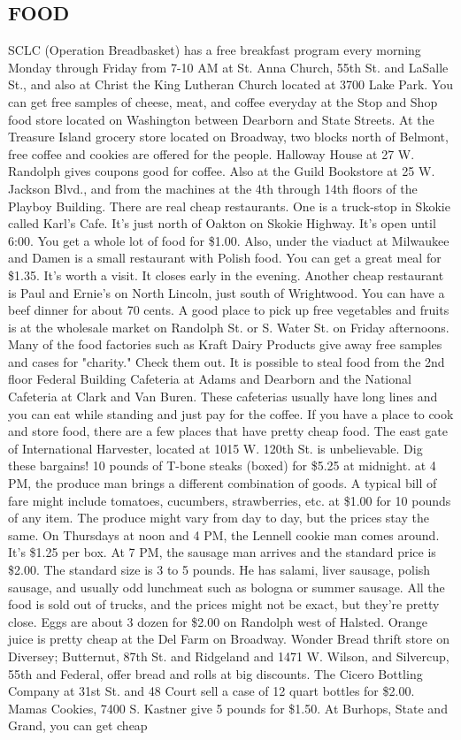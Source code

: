 \documentclass[11pt,twoside,a4paper]{book}
\begin{document}
\subsection{FOOD}
SCLC (Operation Breadbasket) has a free breakfast program every morning Monday through Friday from 7-10 AM at St. Anna Church, 55th St. and LaSalle St., and also at Christ the King Lutheran Church located at 3700 Lake Park. You can get free samples of cheese, meat, and coffee everyday at the Stop and Shop food store located on Washington between Dearborn and State Streets. At the Treasure Island grocery store located on Broadway, two blocks north of Belmont, free coffee and cookies are offered for the people. Halloway House at 27 W. Randolph gives coupons good for coffee. Also at the Guild Bookstore at 25 W. Jackson Blvd., and from the machines at the 4th through 14th floors of the Playboy Building. There are real cheap restaurants. One is a truck-stop in Skokie called Karl's Cafe. It's just north of Oakton on Skokie Highway. It's open until 6:00. You get a whole lot of food for \$1.00. Also, under the viaduct at Milwaukee and Damen is a small restaurant with Polish food. You can get a great meal for \$1.35. It's worth a visit. It closes early in the evening. Another cheap restaurant is Paul and Ernie's on North Lincoln, just south of Wrightwood. You can have a beef dinner for about 70 cents. A good place to pick up free vegetables and fruits is at the wholesale market on Randolph St. or S. Water St. on Friday afternoons. Many of the food factories such as Kraft Dairy Products give away free samples and cases for "charity." Check them out. It is possible to steal food from the 2nd floor Federal Building Cafeteria at Adams and Dearborn and the National Cafeteria at Clark and Van Buren. These cafeterias usually have long lines and you can eat while standing and just pay for the coffee. If you have a place to cook and store food, there are a few places that have pretty cheap food. The east gate of International Harvester, located at 1015 W. 120th St. is unbelievable. Dig these bargains! 10 pounds of T-bone steaks (boxed) for \$5.25 at midnight. at 4 PM, the produce man brings a different combination of goods. A typical bill of fare might include tomatoes, cucumbers, strawberries, etc. at \$1.00 for 10 pounds of any item. The produce might vary from day to day, but the prices stay the same. On Thursdays at noon and 4 PM, the Lennell cookie man comes around. It's \$1.25 per box. At 7 PM, the sausage man arrives and the standard price is \$2.00. The standard size is 3 to 5 pounds. He has salami, liver sausage, polish sausage, and usually odd lunchmeat such as bologna or summer sausage. All the food is sold out of trucks, and the prices might not be exact, but they're pretty close. Eggs are about 3 dozen for \$2.00 on Randolph west of Halsted. Orange juice is pretty cheap at the Del Farm on Broadway. Wonder Bread thrift store on Diversey; Butternut, 87th St. and Ridgeland and 1471 W. Wilson, and Silvercup, 55th and Federal, offer bread and rolls at big discounts. The Cicero Bottling Company at 31st St. and 48 Court sell a case of 12 quart bottles for \$2.00. Mamas Cookies, 7400 S. Kastner give 5 pounds for \$1.50. At Burhops, State and Grand, you can get cheap 
\end{document}
